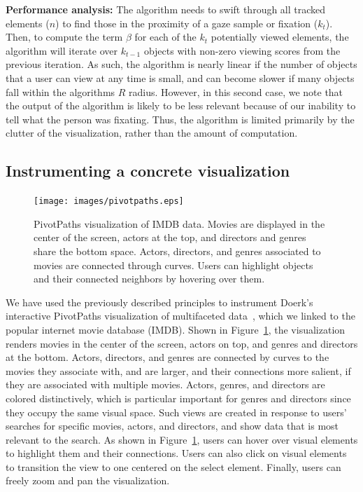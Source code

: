 {\bf Performance analysis:} The algorithm needs to swift through all tracked elements ($n$) to find those in the proximity of a gaze sample or fixation ($k_t$). Then, to compute the term $\beta$ for each of the $k_t$ potentially viewed elements, the algorithm will iterate over $k_{t-1}$ objects with non-zero viewing scores from the previous iteration. As such, the algorithm is nearly linear if the number of objects that a user can view at any time is small, and can become slower if many objects fall within the algorithms $R$ radius. However, in this second case, we note that the output of the algorithm is likely to be less relevant because of our inability to tell what the person was fixating. Thus, the algorithm is limited primarily by the clutter of the visualization, rather than the amount of computation. 


\subsection{Instrumenting a concrete visualization}
\label{sec:InstrumentingVisualization}

\begin{figure}[htb]
  \centering
  \texttt{[image: images/pivotpaths.eps]}
  \caption{PivotPaths visualization of IMDB data. Movies are displayed in the center of the screen, actors at the top, and directors and genres share the bottom space. Actors, directors, and genres associated to movies are connected through curves. Users can highlight objects and their connected neighbors by hovering over them.}
	\label{fig:pivotpaths}
\end{figure}
We have used the previously described principles to instrument Doerk's interactive PivotPaths visualization of multifaceted data~\cite{dork2012pivotpaths}, which we linked to the popular internet movie database (IMDB). Shown in Figure~\ref{fig:pivotpaths}, the visualization renders movies in the center of the screen, actors on top, and genres and directors at the bottom. Actors, directors, and genres are connected by curves to the movies they associate with, and are larger, and their connections more salient, if they are associated with multiple movies. Actors, genres, and directors are colored distinctively, which is particular important for genres and directors since they occupy the same visual space. Such views are created in response to users' searches for specific movies, actors, and directors, and show data that is most relevant to the search. As shown in Figure~\ref{fig:pivotpaths}, users can hover over visual elements to highlight them and their connections. Users can also click on visual elements to transition the view to one centered on the select element. Finally, users can freely zoom and pan the visualization. 

